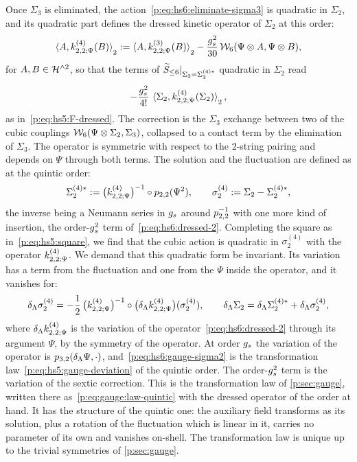 Once $\Sigma_3$ is eliminated, the action~\eqref{p:eq:hs6:eliminate-sigma3} is quadratic in $\Sigma_2$, and its quadratic part defines the dressed kinetic operator of $\Sigma_2$ at this order:
\begin{equation}
  \label{p:eq:hs6:dressed-2}
  \pair[2]{A}{\kin{2}{\Psi}{4}(B)}
    := \pair[2]{A}{\kin{2}{\Psi}{3}(B)}
      - \frac{\gs^2}{30} \, \dvertex{6}(\Psi \otimes A, \Psi \otimes B),
\end{equation}
for $A, B \in \Hn{2}$, so that the terms of $\caction[\le 6] |_{\Sigma_3 = \Sigma_3^{(4)*}}$ quadratic in $\Sigma_2$ read
\begin{equation}
  - \frac{\gs^2}{4!} \, \pair[2]{\Sigma_2}{\kin{2}{\Psi}{4}(\Sigma_2)},
\end{equation}
as in~\eqref{p:eq:hs5:F-dressed}.
The correction is the $\Sigma_3$ exchange between two of the cubic couplings $\dvertex{6}(\Psi \otimes \Sigma_2, \Sigma_3)$, collapsed to a contact term by the elimination of $\Sigma_3$.
The operator is symmetric with respect to the $2$-string pairing and depends on $\Psi$ through both terms.
The solution and the fluctuation are defined as at the quintic order:
\begin{equation}
  \label{p:eq:hs6:saddle-sigma2}
  \Sigma_2^{(4)*}
    := \big( \kin{2}{\Psi}{4} \big)^{-1} \circ \sprod{2}{2}(\Psi^2),
  \qquad
  \sigma_2^{(4)}
    := \Sigma_2 - \Sigma_2^{(4)*},
\end{equation}
the inverse being a Neumann series in $\gs$ around $\sprod{2}{2}^{-1}$ with one more kind of insertion, the order-$\gs^2$ term of~\eqref{p:eq:hs6:dressed-2}.
Completing the square as in~\eqref{p:eq:hs5:square}, we find that the cubic action is quadratic in $\sigma_2^{(4)}$ with the operator $\kin{2}{\Psi}{4}$.
We demand that this quadratic form be invariant.
Its variation has a term from the fluctuation and one from the $\Psi$ inside the operator, and it vanishes for:
\begin{equation}
  \label{p:eq:hs6:gauge-sigma2}
  \delta_\Lambda \sigma_2^{(4)}
    = - \frac{1}{2} \, \big( \kin{2}{\Psi}{4} \big)^{-1} \circ \big( \delta_\Lambda \kin{2}{\Psi}{4} \big) (\sigma_2^{(4)}),
  \qquad
  \delta_\Lambda \Sigma_2
    = \delta_\Lambda \Sigma_2^{(4)*} + \delta_\Lambda \sigma_2^{(4)},
\end{equation}
where $\delta_\Lambda \kin{2}{\Psi}{4}$ is the variation of the operator~\eqref{p:eq:hs6:dressed-2} through its argument $\Psi$, by the symmetry of the operator.
At order $\gs$ the variation of the operator is $\sprod{3}{2}(\delta_\Lambda \Psi, \cdot)$, and~\eqref{p:eq:hs6:gauge-sigma2} is the transformation law~\eqref{p:eq:hs5:gauge-deviation} of the quintic order.
The order-$\gs^2$ term is the variation of the sextic correction.
This is the transformation law of \cref{p:sec:gauge}, written there as~\eqref{p:eq:gauge:law-quintic} with the dressed operator of the order at hand.
It has the structure of the quintic one: the auxiliary field transforms as its solution, plus a rotation of the fluctuation which is linear in it, carries no parameter of its own and vanishes on-shell.
The transformation law is unique up to the trivial symmetries of \cref{p:sec:gauge}.

